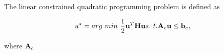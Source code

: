 The linear constrained quadratic programming problem is defined as 



\begin{equation}
u^\star = arg\ min\ \frac{1}{2} \textbf{u}^T \textbf{Hu}\\
s.\ t. \textbf{A}_c \textbf{u}\leq \textbf{b}_c,\\
\label{eq:quadprog_constrained_definition}
\end{equation}

where $\textbf{A}_c$



